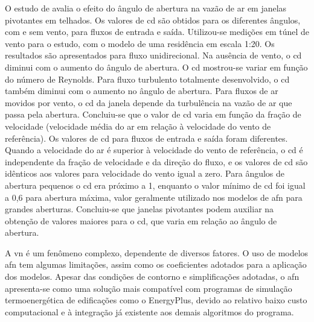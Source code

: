 O estudo de  avalia o efeito do ângulo de abertura na vazão de ar em janelas pivotantes em telhados. Os valores de \acrshort{cd} são obtidos para os diferentes ângulos, com e sem vento, para fluxos de entrada e saída. Utilizou-se medições em túnel de vento para o estudo, com o modelo de uma residência em escala 1:20. Os resultados são apresentados para fluxo unidirecional. Na ausência de vento, o \acrshort{cd} diminui com o aumento do ângulo de abertura. O \acrshort{cd} mostrou-se variar em função do número de Reynolds. Para fluxo turbulento totalmente desenvolvido, o \acrshort{cd} também diminui com o aumento no ângulo de abertura. Para fluxos de ar movidos por vento, o \acrshort{cd} da janela depende da turbulência na vazão de ar que passa pela abertura. Concluiu-se que o valor de \acrshort{cd} varia em função da fração de velocidade (velocidade média do ar em relação à velocidade do vento de referência). Os valores de \acrshort{cd} para fluxos de entrada e saída foram diferentes. Quando a velocidade do ar é superior à velocidade do vento de referência, o \acrshort{cd} é independente da fração de velocidade e da direção do fluxo, e os valores de \acrshort{cd} são idênticos aos valores para velocidade do vento igual a zero. Para ângulos de abertura pequenos o \acrshort{cd} era próximo a 1, enquanto o valor mínimo de \acrshort{cd} foi igual a 0,6 para abertura máxima, valor geralmente utilizado nos modelos de \acrshort{afn} para grandes aberturas. Concluiu-se que janelas pivotantes podem auxiliar na obtenção de valores maiores para o \acrshort{cd}, que varia em relação ao ângulo de abertura.
%

A \acrlong{vn} é um fenômeno complexo, dependente de diversos fatores. O uso de modelos \acrshort{afn} tem algumas limitações, assim como os coeficientes adotados para a aplicação dos modelos. Apesar das condições de contorno e simplificações adotadas, o \acrshort{afn} apresenta-se como uma solução mais compatível com programas de simulação termoenergética de edificações como o EnergyPlus, devido ao relativo baixo custo computacional e à integração já	existente aos demais algoritmos do programa.

